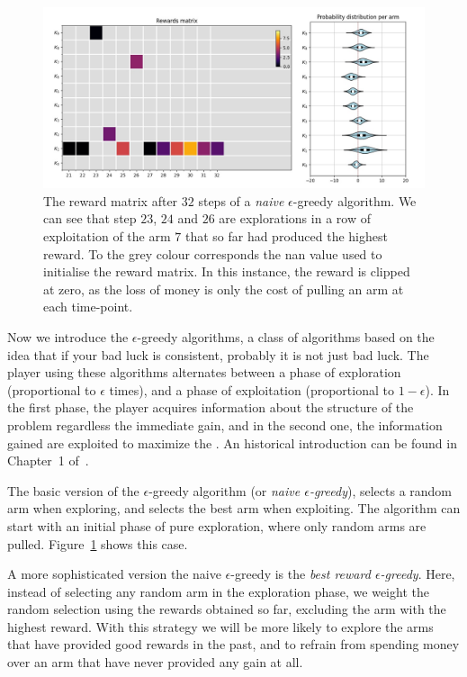 \documentclass[]{scrartcl}
\theoremstyle{definition}
\begin{document}
\begin{figure}[h]
    \hspace{-1cm}
    \includegraphics[width=17cm]{figures/step_32.jpg}
    \caption{The reward matrix after $32$ steps of a \emph{naive} $\epsilon$-greedy algorithm. We can see that step $23$, $24$ and $26$ are explorations in a row of exploitation of the arm $7$ that so far had produced the highest reward. To the grey colour corresponds the nan value used to initialise the reward matrix. In this instance, the reward is clipped at zero, as the loss of money is only the cost of pulling an arm at each time-point.}
    \label{fig:step_32}
\end{figure}

Now we introduce the $\epsilon$-greedy algorithms,
a class of algorithms based on the idea that if your bad luck is consistent, probably it is not just bad luck. The player using these algorithms alternates between a phase of exploration (proportional to $\epsilon$ times), and a phase of exploitation (proportional to $1 - \epsilon$). In the first phase, the player acquires information about the structure of the problem regardless the immediate gain, and in the second one, the information gained are exploited to maximize the . An historical introduction can be found in Chapter~1 of~\cite{sutton2018reinforcement}.

The basic version of the $\epsilon$-greedy algorithm (or \emph{naive $\epsilon$-greedy}), selects a random arm when exploring, and selects the best arm when exploiting. The algorithm can start with an initial phase of pure exploration, where only random arms are pulled. Figure~\ref{fig:step_32} shows this case.

A more sophisticated version the naive $\epsilon$-greedy is the \emph{best reward $\epsilon$-greedy}. Here, instead of selecting any random arm in the exploration phase, we weight the random selection using the rewards obtained so far, excluding the arm with the highest reward. With this strategy we will be more likely to explore the arms that have provided good rewards in the past, and to refrain from spending money over an arm that have never provided any gain at all.
\end{document}
